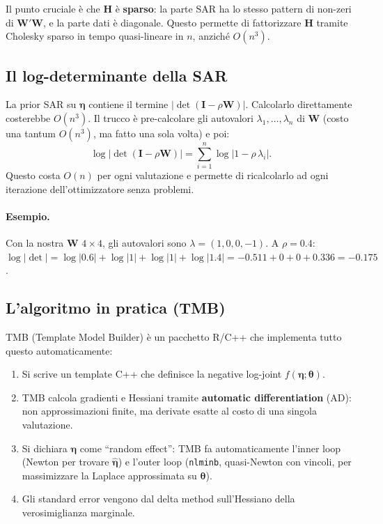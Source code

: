 \documentclass[12pt,a4paper]{article}
\newcommand{\bW}{\mathbf{W}}
\newcommand{\bI}{\mathbf{I}}
\begin{document}
Il punto cruciale \`e che $\mathbf{H}$ \`e \textbf{sparso}: la parte SAR ha lo stesso pattern di non-zeri di $\bW'\bW$, e la parte dati \`e diagonale. Questo permette di fattorizzare $\mathbf{H}$ tramite Cholesky sparso in tempo quasi-lineare in $n$, anzich\'e $O(n^3)$.

\subsection{Il log-determinante della SAR}

La prior SAR su $\boldsymbol{\eta}$ contiene il termine $|\det(\bI - \rho\bW)|$. Calcolarlo direttamente costerebbe $O(n^3)$. Il trucco \`e pre-calcolare gli autovalori $\lambda_1,\ldots,\lambda_n$ di $\bW$ (costo una tantum $O(n^3)$, ma fatto una sola volta) e poi:
\[
  \log|\det(\bI - \rho\bW)| = \sum_{i=1}^{n} \log|1 - \rho\,\lambda_i|.
\]
Questo costa $O(n)$ per ogni valutazione e permette di ricalcolarlo ad ogni iterazione dell'ottimizzatore senza problemi.

\paragraph{Esempio.}
Con la nostra $\bW$ $4 \times 4$, gli autovalori sono $\lambda = (1, 0, 0, -1)$.
A $\rho = 0.4$: $\log|\det| = \log|0.6| + \log|1| + \log|1| + \log|1.4| = -0.511 + 0 + 0 + 0.336 = -0.175$.

\subsection{L'algoritmo in pratica (TMB)}

TMB (Template Model Builder) \`e un pacchetto R/C++ che implementa tutto questo automaticamente:

\begin{enumerate}
  \item Si scrive un template C++ che definisce la negative log-joint $f(\boldsymbol{\eta}; \boldsymbol{\theta})$.
  \item TMB calcola gradienti e Hessiani tramite \textbf{automatic differentiation} (AD): non approssimazioni finite, ma derivate esatte al costo di una singola valutazione.
  \item Si dichiara $\boldsymbol{\eta}$ come ``random effect'': TMB fa automaticamente l'inner loop (Newton per trovare $\hat{\boldsymbol{\eta}}$) e l'outer loop (\texttt{nlminb}, quasi-Newton con vincoli, per massimizzare la Laplace approssimata su $\boldsymbol{\theta}$).
  \item Gli standard error vengono dal delta method sull'Hessiano della verosimiglianza marginale.
\end{enumerate}
\end{document}
